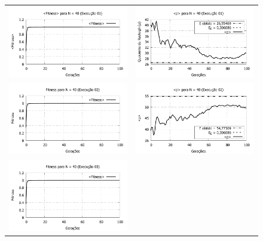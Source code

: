 \newpage
\begin{figure}[p]
\centering
  \begin{tabular}{@{}cc@{}}
    \includegraphics[width=.45\textwidth]{figs/resultados/fitnessGrad/N40_01_fitness.pdf} &
    \includegraphics[width=.45\textwidth]{figs/resultados/fitnessGrad/N40_01_rho.pdf}   \\
		\includegraphics[width=.45\textwidth]{figs/resultados/fitnessGrad/N40_02_fitness.pdf} &
    \includegraphics[width=.45\textwidth]{figs/resultados/fitnessGrad/N40_02_rho.pdf}   \\
		\includegraphics[width=.45\textwidth]{figs/resultados/fitnessGrad/N40_03_fitness.pdf} &

\end{tabular}
\end{figure}
